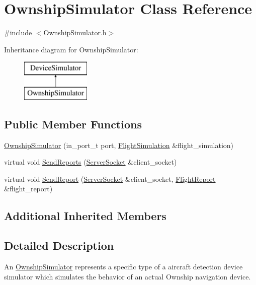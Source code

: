 \hypertarget{class_ownship_simulator}{}\section{Ownship\+Simulator Class Reference}
\label{class_ownship_simulator}


{\ttfamily \#include $<$Ownship\+Simulator.\+h$>$}

Inheritance diagram for Ownship\+Simulator\+:\begin{figure}[H]
\begin{center}
\leavevmode
\includegraphics[height=2.000000cm]{class_ownship_simulator}
\end{center}
\end{figure}
\subsection*{Public Member Functions}
\begin{DoxyCompactItemize}
\item 
\hyperlink{class_ownship_simulator_a8a94cf0dc698a68488dbed92cbe78aae}{Ownship\+Simulator} (in\+\_\+port\+\_\+t port, \hyperlink{class_flight_simulation}{Flight\+Simulation} \&flight\+\_\+simulation)
\item 
virtual void \hyperlink{class_ownship_simulator_ab275b2aa195d1066027370fc5a2712f2}{Send\+Reports} (\hyperlink{class_server_socket}{Server\+Socket} \&client\+\_\+socket)
\item 
virtual void \hyperlink{class_ownship_simulator_a2dc9bbca8f760c19311abb3570aa720e}{Send\+Report} (\hyperlink{class_server_socket}{Server\+Socket} \&client\+\_\+socket, \hyperlink{class_flight_report}{Flight\+Report} \&flight\+\_\+report)
\end{DoxyCompactItemize}
\subsection*{Additional Inherited Members}


\subsection{Detailed Description}
An \hyperlink{class_ownship_simulator}{Ownship\+Simulator} represents a specific type of a aircraft detection device simulator which simulates the behavior of an actual Ownship navigation device. 

